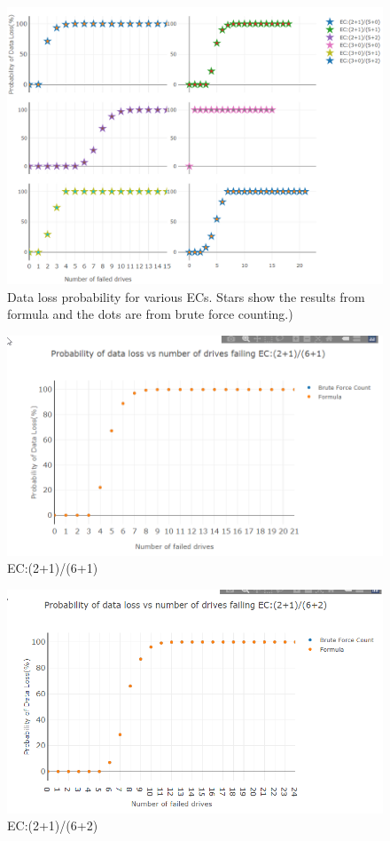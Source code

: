 \documentclass[journal]{IEEEtran}
\begin{document}
\begin{figure}[H]

{\centering \includegraphics[width=0.65\linewidth]{combined} 

}

\caption{Data loss probability for various ECs. Stars show the results from formula and the dots are from brute force counting.)}\label{fig:combined}
\end{figure}

\begin{figure}[H]

{\centering \includegraphics[width=0.65\linewidth]{2161} 

}

\caption{EC:(2+1)/(6+1)}\label{fig:2161}
\end{figure}

\begin{figure}[H]

{\centering \includegraphics[width=0.65\linewidth]{2162} 

}

\caption{EC:(2+1)/(6+2)}\label{fig:2162}
\end{figure}
\end{document}
